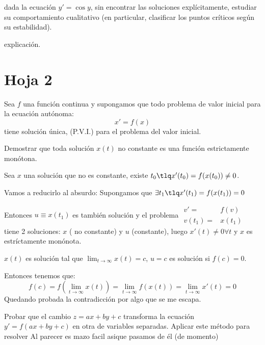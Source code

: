 \documentclass[nochap]{apuntes}
\begin{document}
\newpage
\begin{problem}[21]
dada la ecuación $y'=\cos y$, sin encontrar las soluciones explícitamente, estudiar su comportamiento cualitativo (en particular, clasificar los puntos críticos según su estabilidad).
\solution
\begin{expla}
explicación.
\end{expla}
\end{problem}

\section{Hoja 2}
\begin{problem}[2]

Sea $f$ una función continua y supongamos que todo problema de valor inicial para la ecuación autónoma: \[x'=f(x)\]
tiene solución única, (P.V.I.) para el problema del valor inicial.

\ppart Demostrar que toda solución $x(t)$ no constante es una función estrictamente monótona.


\solution

\spart Sea $x$ una solución que no es constante, existe $t_0 \tlq x'(t_0) = f(x(t_0)) \neq 0$.

Vamos a reducirlo al absurdo: Supongamos que $\exists t_1 \tlq x'(t_1) = f(x(t_1)) = 0$ 

Entonces $u\equiv x(t_1) $ es también solución y el problema $\displaystyle \begin{array}{cc} v'=&f(v)\\v(t_1)=&x(t_1)\end{array}$ tiene 2 soluciones: $x$ ( no constante) y $u$ (constante), luego $x'(t)\neq 0 \forall t$ y $x$ es estríctamente monónota.

$x(t)$ es solución tal que $\lim_{t\to\infty} x(t) = c$, $u=c$ es solución si $f(c)=0$.

Entonces tenemos que:
\[f(c) = f(\lim_{t\to\infty} x(t)) = \lim_{t\to\infty} f(x(t)) = \lim_{t\to\infty}x'(t)=0\]
Quedando probada la contradicción por algo que se me escapa.
\end{problem}

\begin{problem}[3]


Probar que el cambio $z = ax + by + c$ transforma la ecuación $y'= f(ax + by + c)$
en otra de variables separadas. Aplicar este método para resolver
\solution
Al parecer es mazo facil asique pasamos de él (de momento)
\end{problem}
\end{document}
